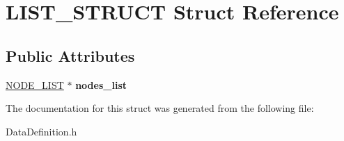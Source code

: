 \hypertarget{structLIST__STRUCT}{\section{L\-I\-S\-T\-\_\-\-S\-T\-R\-U\-C\-T Struct Reference}
\label{structLIST__STRUCT}
}
\subsection*{Public Attributes}
\begin{DoxyCompactItemize}
\item 
\hypertarget{structLIST__STRUCT_a480f01d85e0c69f63eeeb62c4378e19e}{\hyperlink{structNODE__LIST__STRUCT}{N\-O\-D\-E\-\_\-\-L\-I\-S\-T} $\ast$ {\bfseries nodes\-\_\-list}}\label{structLIST__STRUCT_a480f01d85e0c69f63eeeb62c4378e19e}

\end{DoxyCompactItemize}


The documentation for this struct was generated from the following file\-:\begin{DoxyCompactItemize}
\item 
Data\-Definition.\-h\end{DoxyCompactItemize}
